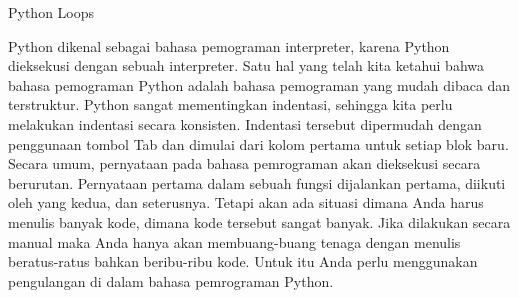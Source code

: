 \sloppy
\begin{center}
Python Loops
\end{center} \par
\vspace{12pt}
\vspace{12pt}
Python dikenal sebagai bahasa pemograman interpreter, karena Python dieksekusi dengan sebuah interpreter. Satu hal yang telah kita ketahui bahwa bahasa pemograman Python adalah bahasa pemograman yang mudah dibaca dan terstruktur. Python sangat mementingkan indentasi, sehingga kita perlu melakukan indentasi secara konsisten. Indentasi tersebut dipermudah dengan penggunaan tombol Tab dan dimulai dari kolom pertama untuk setiap blok baru\cite{santoso2009bahasa}.
Secara umum, pernyataan pada bahasa pemrograman akan dieksekusi secara berurutan. Pernyataan pertama dalam sebuah fungsi dijalankan pertama, diikuti oleh yang kedua, dan seterusnya. Tetapi akan ada situasi dimana Anda harus menulis banyak kode, dimana kode tersebut sangat banyak. Jika dilakukan secara manual maka Anda hanya akan membuang-buang tenaga dengan menulis beratus-ratus bahkan beribu-ribu kode. Untuk itu Anda perlu menggunakan pengulangan di dalam bahasa pemrograman Python. \par

